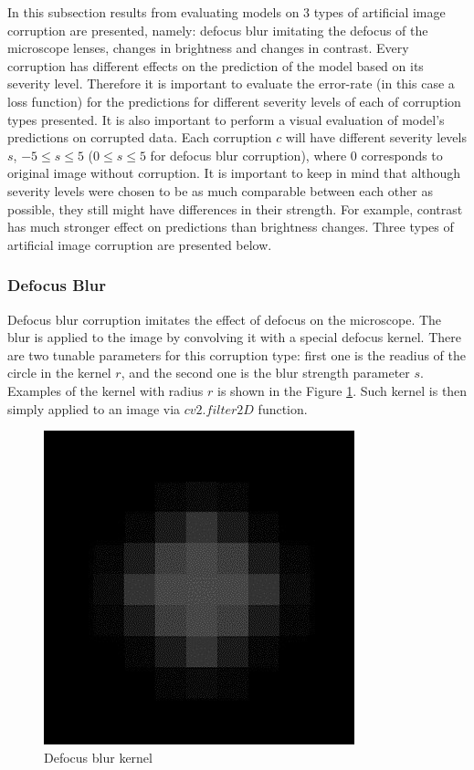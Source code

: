 
In this subsection results from evaluating models on 3 types of artificial image corruption are presented, namely: defocus blur imitating the defocus of the microscope lenses, changes in brightness and changes in contrast. Every corruption  has different effects on the prediction of the model based on its severity level. Therefore it is important to evaluate the error-rate (in this case a loss function) for the predictions for different severity levels of each of corruption types presented. It is also important to perform a visual evaluation of model's predictions on corrupted data. Each corruption $c$ will have different severity levels $s$, $-5 \leq s \leq 5$ ($0 \leq s \leq 5$ for defocus blur corruption), where $0$ corresponds to original image without corruption. It is important to keep in mind that although severity levels were chosen to be as much comparable between each other as possible, they still might have differences in their strength. For example, contrast has much stronger effect on predictions than brightness changes. Three types of artificial image corruption are presented below.

\subsubsection{Defocus Blur}
Defocus blur corruption imitates the effect of defocus on the microscope. The blur is applied to the image by convolving it with a special defocus kernel. There are two tunable parameters for this corruption type: first one is the readius of the circle in the kernel $r$, and the second one is the blur strength parameter $s$. Examples of the kernel with radius $r$ is shown in the Figure \ref{fig:defocus-blur-kernel}. Such kernel is then simply applied to an image via $cv2.filter2D$ function.

\begin{figure}[htb]
	\begin{center}
		\includegraphics[width=0.2\linewidth]{bilder/stability/defocus-blur-kernel.png}
		\caption{Defocus blur kernel}\label{fig:defocus-blur-kernel}
	\end{center}
\end{figure}

